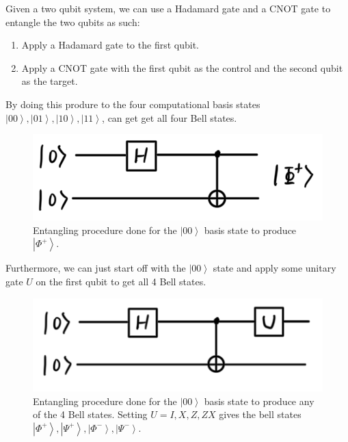 \documentclass{article}
\newcommand{\ket}[1]{\ensuremath{\left|#1\right\rangle}}
\begin{document}
    \begin{lemma}
      Given a two qubit system, we can use a Hadamard gate and a CNOT gate to entangle the two qubits as such: 
      \begin{enumerate} 
        \item Apply a Hadamard gate to the first qubit. 
        \item Apply a CNOT gate with the first qubit as the control and the second qubit as the target.
      \end{enumerate}
      By doing this produre to the four computational basis states $\ket{00}, \ket{01}, \ket{10}, \ket{11}$, can get get all four Bell states. 
      \begin{figure}[H]
        \centering 
        \includegraphics[scale=0.5]{img/Entangling_qubits.png}
        \caption{Entangling procedure done for the $\ket{00}$ basis state to produce $\ket{\Phi^+}$. } 
        \label{fig:entangling_qubits}
      \end{figure}
      Furthermore, we can just start off with the $\ket{00}$ state and apply some unitary gate $U$ on the first qubit to get all 4 Bell states. 
      \begin{figure}[H]
        \centering 
        \includegraphics[scale=0.4]{img/Entangling_qubits_with_U.png}
        \caption{Entangling procedure done for the $\ket{00}$ basis state to produce any of the 4 Bell states. Setting $U =I, X, Z, ZX$ gives the bell states $\ket{\Phi^+}, \ket{\Psi^+}, \ket{\Phi^-}, \ket{\Psi^-}$.}
        \label{fig:entangling_qubits_with_U}
      \end{figure}
    \end{lemma}
\end{document}
